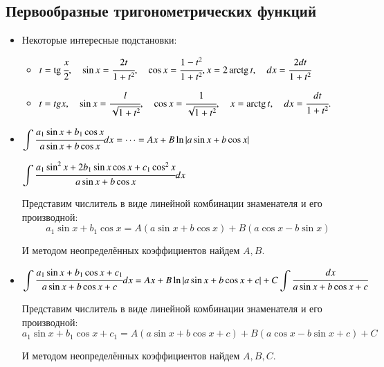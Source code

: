 \documentclass[twoside, a4paperpt, fleqn]{extarticle}
\begin{document}
\begin{itemize}
\end{itemize}
\subsection*{Первообразные тригонометрических функций}
\begin{itemize}
    \item Некоторые интересные подстановки:
    \begin{itemize}
        \item $ t=\operatorname{tg} \cfrac{x}{2}, \quad \sin x=\cfrac{2 t}{1+t^{2}}, \quad \cos x=\cfrac{1-t^{2}}{1+t^{2}}, x=2 \operatorname{arctg} t, \quad d x=\cfrac{2 d t}{1+t^{2}}$
    
        \item $t = tg x, \quad \sin x=\cfrac{l}{\sqrt{1+t^{2}}}, \quad \cos x=\cfrac{1}{\sqrt{1+t^{2}}}, \quad x=\operatorname{arctg} t, \quad d x=\cfrac{d t}{1+t^{2}} .$
    \end{itemize}

    \item $\displaystyle \int \cfrac{a_{1} \sin x+b_{1} \cos x}{a \sin x+b \cos x} d x =\cdots = A x+B \ln |a \sin x+b \cos x| $
    
    $\displaystyle \int \cfrac{a_{1} \sin ^{2} x+2 b_{1} \sin x \cos x+c_{1} \cos ^{2} x}{a \sin x+b \cos x} d x$
    
    Представим числитель в виде линейной комбинации знаменателя и его производной: 
    $$a_{1} \sin x+b_{1} \cos x=A(a \sin x+b \cos x)+B(a \cos x-b \sin x)$$

    И методом неопределённых коэффициентов найдем $A, B$.

    \item $\displaystyle \int \cfrac{a_{1} \sin x+b_{1} \cos x+c_{1}}{a \sin x+b \cos x+c} d x=A x+B \ln |a \sin x+b \cos x+c|+C \displaystyle \int \cfrac{d x}{a \sin x+b \cos x+c} $
    
    Представим числитель в виде линейной комбинации знаменателя и его производной: 
    $$ a_{1} \sin x+b_{1} \cos x+c_{1}=A(a \sin x+b \cos x+c)+B(a \cos x-b \sin x + c)+C $$

    И методом неопределённых коэффициентов найдем $A, B, C$.
    

\end{itemize}
\end{document}
